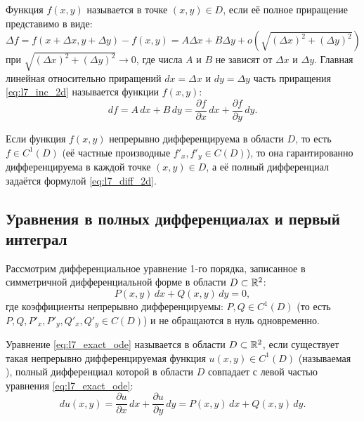 \begin{definition}
    Функция $f(x, y)$ называется  в точке
    $(x, y) \in D$, если её полное приращение представимо в виде:
    \begin{equation} \label{eq:l7_inc_2d}
        \Delta f = f(x + \Delta x, y + \Delta y) - f(x, y) =
        A \Delta x + B \Delta y +
        o\left(\sqrt{(\Delta x)^2 + (\Delta y)^2}\right) \tag{3}
    \end{equation}
    при $\sqrt{(\Delta x)^2 + (\Delta y)^2} \to 0$, где числа $A$ и $B$ не
    зависят от $\Delta x$ и $\Delta y$. Главная линейная относительно
    приращений $dx = \Delta x$ и $dy = \Delta y$ часть приращения \eqref{eq:l7_inc_2d}
    называется  функции $f(x, y)$:
    \begin{equation} \label{eq:l7_diff_2d}
        df = A \, dx + B \, dy =
        \frac{\partial f}{\partial x} \, dx +
        \frac{\partial f}{\partial y} \, dy. \tag{4}
    \end{equation}
\end{definition}

\begin{remark}
    Если функция $f(x, y)$ непрерывно дифференцируема в области $D$, то есть
    $f \in C^1(D)$ (её частные производные $f'_x, f'_y \in C(D)$), то она
    гарантированно дифференцируема в каждой точке $(x, y) \in D$, а её полный
    дифференциал задаётся формулой \eqref{eq:l7_diff_2d}.
\end{remark}

\subsection{Уравнения в полных дифференциалах и первый интеграл}

Рассмотрим дифференциальное уравнение 1-го порядка, записанное в симметричной
дифференциальной форме в области $D \subset \mathbb{R}^2$:
\begin{equation} \label{eq:l7_exact_ode}
    P(x, y) \, dx + Q(x, y) \, dy = 0, \tag{5}
\end{equation}
где коэффициенты непрерывно дифференцируемы: $P, Q \in C^1(D)$ (то есть
$P, Q, P'_x, P'_y, Q'_x, Q'_y \in C(D)$) и не обращаются в нуль одновременно.

\begin{definition}
    Уравнение \eqref{eq:l7_exact_ode} называется  в области $D \subset \mathbb{R}^2$, если существует такая
    непрерывно дифференцируемая функция $u(x, y) \in C^1(D)$ (называемая
    ), полный дифференциал которой в области $D$
    совпадает с левой частью уравнения \eqref{eq:l7_exact_ode}:
    \begin{equation} \label{eq:l7_exact_du}
        du(x, y) = \frac{\partial u}{\partial x} \, dx +
        \frac{\partial u}{\partial y} \, dy = P(x, y) \, dx + Q(x, y) \, dy.
        \tag{6}
    \end{equation}
\end{definition}

